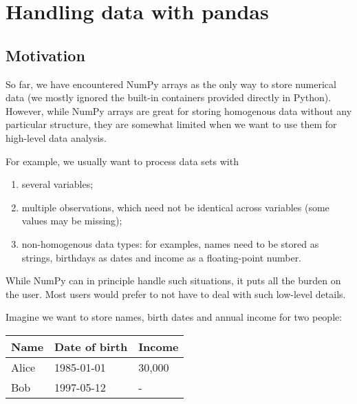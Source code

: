 \documentclass{scrartcl}
\providecommand{\tightlist}{%
      \setlength{\itemsep}{0pt}\setlength{\parskip}{0pt}}
\begin{document}
    
    \maketitle
    \tableofcontents
    
    

    
    \hypertarget{handling-data-with-pandas}{%
\section{Handling data with pandas}\label{handling-data-with-pandas}}

\hypertarget{motivation}{%
\subsection{Motivation}\label{motivation}}

So far, we have encountered NumPy arrays as the only way to store
numerical data (we mostly ignored the built-in containers provided
directly in Python). However, while NumPy arrays are great for storing
homogenous data without any particular structure, they are somewhat
limited when we want to use them for high-level data analysis.

For example, we usually want to process data sets with

\begin{enumerate}
\def\labelenumi{\arabic{enumi}.}
\tightlist
\item
  several variables;
\item
  multiple observations, which need not be identical across variables
  (some values may be missing);
\item
  non-homogenous data types: for examples, names need to be stored as
  strings, birthdays as dates and income as a floating-point number.
\end{enumerate}

While NumPy can in principle handle such situations, it puts all the
burden on the user. Most users would prefer to not have to deal with
such low-level details.

Imagine we want to store names, birth dates and annual income for two
people:

\begin{longtable}[]{@{}lll@{}}
\toprule
Name & Date of birth & Income\tabularnewline
\midrule
\endhead
Alice & 1985-01-01 & 30,000\tabularnewline
Bob & 1997-05-12 & -\tabularnewline
\bottomrule
\end{longtable}
\end{document}
